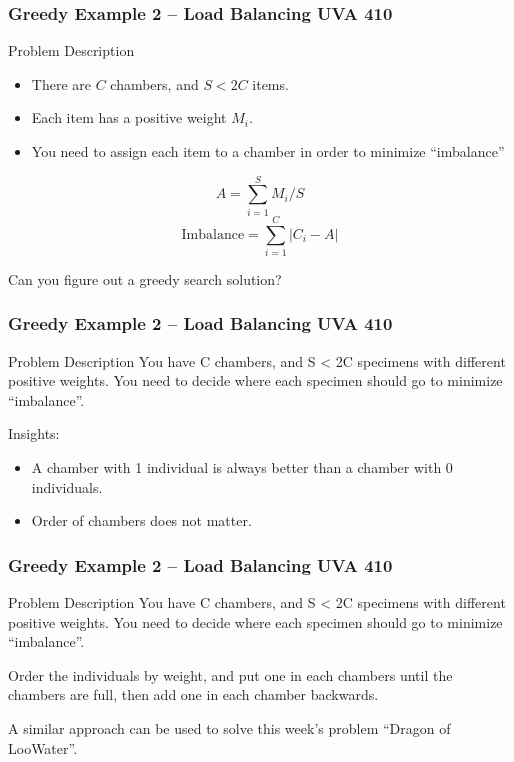 \begin{frame}
  \frametitle{Greedy Example 2 -- Load Balancing UVA 410}

  \begin{block}{Problem Description}

    \begin{itemize}
    \item There are $C$ chambers, and $S < 2C$ items.
    \item Each item has a positive weight $M_i$.
    \item You need to assign each item to a chamber in order to minimize ``imbalance''
    \end{itemize}

    \begin{equation*}
      A = \sum^S_{i=1}M_i/S
    \end{equation*}
    \begin{equation*}
      \text{Imbalance} = \sum^C_{i=1} |C_i - A|
    \end{equation*}
  \end{block}


  Can you figure out a greedy search solution?
\end{frame}


\begin{frame}
  \frametitle{Greedy Example 2 -- Load Balancing UVA 410}

  \begin{block}{Problem Description}
  You have C chambers, and S < 2C specimens with different positive
  weights. You need to decide where each specimen should go to
  minimize ``imbalance''.
  \end{block}

  Insights:

  \begin{itemize}
  \item A chamber with 1 individual is always better than a chamber
    with 0 individuals.

    \medskip

  \item Order of chambers does not matter.
  \end{itemize}
\end{frame}

\begin{frame}
  \frametitle{Greedy Example 2 -- Load Balancing UVA 410}

  \begin{block}{Problem Description}
  You have C chambers, and S < 2C specimens with different positive
  weights. You need to decide where each specimen should go to
  minimize ``imbalance''.
  \end{block}

  \vfill

   Order the individuals by weight, and
  put one in each chambers until the chambers are full, then add one
  in each chamber backwards.

  \bigskip

  A similar approach can be used to solve this week's problem ``Dragon
  of LooWater''.
\end{frame}

